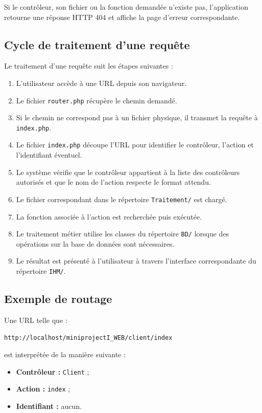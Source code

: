 Si le contrôleur, son fichier ou la fonction demandée n'existe pas, l'application retourne une réponse HTTP 404 et affiche la page d'erreur correspondante.

\subsection*{Cycle de traitement d'une requête}

Le traitement d'une requête suit les étapes suivantes :

\begin{enumerate}[leftmargin=*]
    \item L'utilisateur accède à une URL depuis son navigateur.
    \item Le fichier \texttt{router.php} récupère le chemin demandé.
    \item Si le chemin ne correspond pas à un fichier physique, il transmet la requête à \texttt{index.php}.
    \item Le fichier \texttt{index.php} découpe l'URL pour identifier le contrôleur, l'action et l'identifiant éventuel.
    \item Le système vérifie que le contrôleur appartient à la liste des contrôleurs autorisés et que le nom de l'action respecte le format attendu.
    \item Le fichier correspondant dans le répertoire \texttt{Traitement/} est chargé.
    \item La fonction associée à l'action est recherchée puis exécutée.
    \item Le traitement métier utilise les classes du répertoire \texttt{BD/} lorsque des opérations sur la base de données sont nécessaires.
    \item Le résultat est présenté à l'utilisateur à travers l'interface correspondante du répertoire \texttt{IHM/}.
\end{enumerate}

\subsection*{Exemple de routage}

Une URL telle que :

\begin{center}
    \texttt{http://localhost/miniprojectI\_WEB/client/index}
\end{center}

est interprétée de la manière suivante :

\begin{itemize}[leftmargin=*]
    \item \textbf{Contrôleur :} \texttt{Client} ;
    \item \textbf{Action :} \texttt{index} ;
    \item \textbf{Identifiant :} aucun.
\end{itemize}

